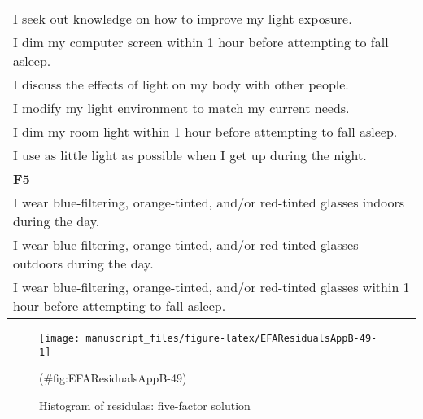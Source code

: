 \begin{appendix}
\begin{longtable}[]{@{}
  >{\raggedright\arraybackslash}p{}@{}}
I seek out knowledge on how to improve my light exposure. \\
I dim my computer screen within 1 hour before attempting to fall
asleep. \\
I discuss the effects of light on my body with other people. \\
I modify my light environment to match my current needs. \\
I dim my room light within 1 hour before attempting to fall asleep. \\
I use as little light as possible when I get up during the night. \\
\textbf{F5} \\
I wear blue-filtering, orange-tinted, and/or red-tinted glasses indoors
during the day. \\
I wear blue-filtering, orange-tinted, and/or red-tinted glasses outdoors
during the day. \\
I wear blue-filtering, orange-tinted, and/or red-tinted glasses within 1
hour before attempting to fall asleep. \\
\bottomrule
\end{longtable}

\begin{figure}

{\centering \texttt{[image: manuscript\_files/figure-latex/EFAResidualsAppB-49-1]} 

}

\caption{ Histogram of residulas:  five-factor solution}(\#fig:EFAResidualsAppB-49)
\end{figure}
\end{appendix}
